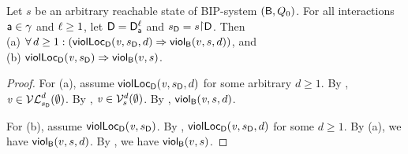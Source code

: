\begin{proposition}
\label{prop:locScViol-implies-scViol}
\label{prop:lviol-implies-viol}
Let $s$ be an arbitrary reachable state of BIP-system $(\B, Q_0)$.
For all interactions $\act \in \gamma$ and $\l \ge 1$, let $\DS = \dsks{\act}{\l}$ and $\sD = s \pj \dsk{\act}{\l}$.
Then\\
\ind (a) $\fa d \ge 1:  (\scVLd{\ndv}{d}{\sD}{\act}{\l} \imp \scVd{v}{d}{s}) $, and\\
\ind (b) $\scVL{\ndv}{\sD}{\act}{\l} \imp \scV{v}{s}$.
\end{proposition}
%
\begin{proof}
For (a), assume $\scVLd{\ndv}{d}{\sD}{\act}{\l}$ for some arbitrary $d \ge 1$.
By ,  $\ndv \in \lVFsi{\sD}{\ewfg}{d}$.
By ,  $\ndv  \in \VFsi{s}{\ewfg}{d}$.
By , $\scVd{\ndv}{d}{s}$.

For (b), assume $\scVL{\ndv}{\sD}{\act}{\l}$. By ,
$\scVLd{\ndv}{d}{\sD}{\act}{\l}$ for some $d \ge 1$. By (a), we have $\scVd{v}{d}{s}$.
By , we have $\scV{v}{s}$.
\end{proof}
